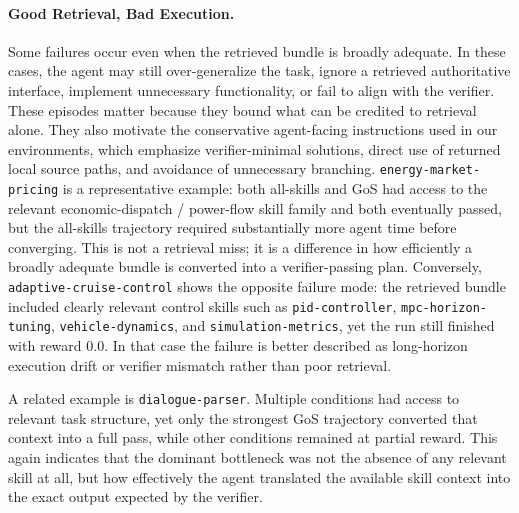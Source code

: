 \paragraph{Good Retrieval, Bad Execution.}
Some failures occur even when the retrieved bundle is broadly adequate. In these cases, the agent may still over-generalize the task, ignore a retrieved authoritative interface, implement unnecessary functionality, or fail to align with the verifier. These episodes matter because they bound what can be credited to retrieval alone. They also motivate the conservative agent-facing instructions used in our environments, which emphasize verifier-minimal solutions, direct use of returned local source paths, and avoidance of unnecessary branching. \texttt{energy-market-pricing} is a representative example: both all-skills and GoS had access to the relevant economic-dispatch / power-flow skill family and both eventually passed, but the all-skills trajectory required substantially more agent time before converging. This is not a retrieval miss; it is a difference in how efficiently a broadly adequate bundle is converted into a verifier-passing plan. Conversely, \texttt{adaptive-cruise-control} shows the opposite failure mode: the retrieved bundle included clearly relevant control skills such as \texttt{pid-controller}, \texttt{mpc-horizon-tuning}, \texttt{vehicle-dynamics}, and \texttt{simulation-metrics}, yet the run still finished with reward $0.0$. In that case the failure is better described as long-horizon execution drift or verifier mismatch rather than poor retrieval.

A related example is \texttt{dialogue-parser}. Multiple conditions had access to relevant task structure, yet only the strongest GoS trajectory converted that context into a full pass, while other conditions remained at partial reward. This again indicates that the dominant bottleneck was not the absence of any relevant skill at all, but how effectively the agent translated the available skill context into the exact output expected by the verifier.

